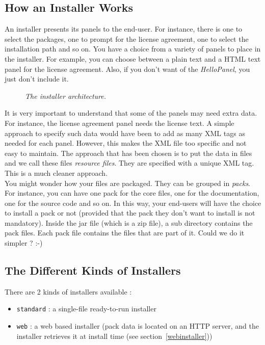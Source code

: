 \subsection{How an Installer Works}

An installer presents its panels to the end-user. For instance, there is
one to select the packages, one to prompt for the license agreement, one
to select the installation path and so on. You have a choice from a
variety of panels to place in the installer. For example, you can choose
between a plain text and a HTML text panel for the license agreement.
Also, if you don't want of the \textit{HelloPanel}, you just don't
include it.\\ 

\begin{figure}[h]
\caption{\label{archinstaller}
         \textit{The installer architecture.}}
\begin{center}
\end{center}
\end{figure}

It is very important to understand that some of the panels may need extra data. For
instance, the license agreement panel needs the license text. A simple approach
to specify such data would have been to add as many XML tags as needed for
each panel. However, this makes the XML file too specific and not easy to
maintain. The approach that has been chosen is to put the data in files and we
call these files \textit{resource files}. They are specified with a unique XML
tag. This is a much cleaner approach.\\

You might wonder how your files are packaged. They can be grouped in
\textit{packs}. For instance, you can have one pack for the core files, one for
the documentation, one for the source code and so on. In this way, your end-users
will have the choice to install a pack or not (provided that the pack they don't
want to install is not mandatory). Inside the jar file (which is a zip file), a
sub directory contains the pack files. Each pack file contains the files that are
part of it. Could we do it simpler ? :-)\\

\subsection{The Different Kinds of Installers}

There are 2 kinds of installers available :
\begin{itemize}
  \item \texttt{standard} : a single-file ready-to-run installer
  \item \texttt{web} : a web based installer (pack data is located on
  an HTTP server, and the installer retrieves it at install time (see
  section~\ref{webinstaller}))
\end{itemize}

